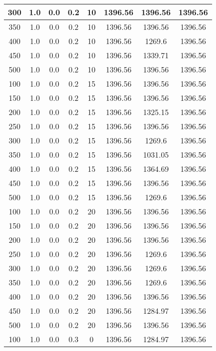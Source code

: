 \documentclass[a4paper, 12pt]{extreport}
\begin{document}
\begin{itemize}
\begin{longtable}{|c|c|c|c|c|c|c|c|}
			300 & 1.0 & 0.0 & 0.2 & 10 & 1396.56 & 1396.56 & 1396.56 \\\hline
			350 & 1.0 & 0.0 & 0.2 & 10 & 1396.56 & 1396.56 & 1396.56 \\\hline
			400 & 1.0 & 0.0 & 0.2 & 10 & 1396.56 & 1269.6 & 1396.56 \\\hline
			450 & 1.0 & 0.0 & 0.2 & 10 & 1396.56 & 1339.71 & 1396.56 \\\hline
			500 & 1.0 & 0.0 & 0.2 & 10 & 1396.56 & 1396.56 & 1396.56 \\\hline
			100 & 1.0 & 0.0 & 0.2 & 15 & 1396.56 & 1396.56 & 1396.56 \\\hline
			150 & 1.0 & 0.0 & 0.2 & 15 & 1396.56 & 1396.56 & 1396.56 \\\hline
			200 & 1.0 & 0.0 & 0.2 & 15 & 1396.56 & 1325.15 & 1396.56 \\\hline
			250 & 1.0 & 0.0 & 0.2 & 15 & 1396.56 & 1396.56 & 1396.56 \\\hline
			300 & 1.0 & 0.0 & 0.2 & 15 & 1396.56 & 1269.6 & 1396.56 \\\hline
			350 & 1.0 & 0.0 & 0.2 & 15 & 1396.56 & 1031.05 & 1396.56 \\\hline
			400 & 1.0 & 0.0 & 0.2 & 15 & 1396.56 & 1364.69 & 1396.56 \\\hline
			450 & 1.0 & 0.0 & 0.2 & 15 & 1396.56 & 1396.56 & 1396.56 \\\hline
			500 & 1.0 & 0.0 & 0.2 & 15 & 1396.56 & 1269.6 & 1396.56 \\\hline
			100 & 1.0 & 0.0 & 0.2 & 20 & 1396.56 & 1396.56 & 1396.56 \\\hline
			150 & 1.0 & 0.0 & 0.2 & 20 & 1396.56 & 1396.56 & 1396.56 \\\hline
			200 & 1.0 & 0.0 & 0.2 & 20 & 1396.56 & 1396.56 & 1396.56 \\\hline
			250 & 1.0 & 0.0 & 0.2 & 20 & 1396.56 & 1269.6 & 1396.56 \\\hline
			300 & 1.0 & 0.0 & 0.2 & 20 & 1396.56 & 1269.6 & 1396.56 \\\hline
			350 & 1.0 & 0.0 & 0.2 & 20 & 1396.56 & 1269.6 & 1396.56 \\\hline
			400 & 1.0 & 0.0 & 0.2 & 20 & 1396.56 & 1396.56 & 1396.56 \\\hline
			450 & 1.0 & 0.0 & 0.2 & 20 & 1396.56 & 1284.97 & 1396.56 \\\hline
			500 & 1.0 & 0.0 & 0.2 & 20 & 1396.56 & 1396.56 & 1396.56 \\\hline
			100 & 1.0 & 0.0 & 0.3 & 0 & 1396.56 & 1284.97 & 1396.56 \\\hline

\end{longtable}
\end{itemize}
\end{document}
